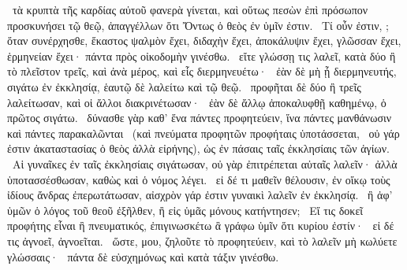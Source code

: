 ~τὰ κρυπτὰ τῆς καρδίας αὐτοῦ φανερὰ γίνεται, καὶ οὕτως πεσὼν ἐπὶ πρόσωπον προσκυνήσει τῷ θεῷ, ἀπαγγέλλων ὅτι Ὄντως ὁ θεὸς ἐν ὑμῖν ἐστιν.
~Τί οὖν ἐστιν, ; ὅταν συνέρχησθε, ἕκαστος ψαλμὸν ἔχει, διδαχὴν ἔχει, ἀποκάλυψιν ἔχει, γλῶσσαν ἔχει, ἑρμηνείαν ἔχει· πάντα πρὸς οἰκοδομὴν γινέσθω.
~εἴτε γλώσσῃ τις λαλεῖ, κατὰ δύο ἢ τὸ πλεῖστον τρεῖς, καὶ ἀνὰ μέρος, καὶ εἷς διερμηνευέτω·
~ἐὰν δὲ μὴ ᾖ διερμηνευτής, σιγάτω ἐν ἐκκλησίᾳ, ἑαυτῷ δὲ λαλείτω καὶ τῷ θεῷ.
~προφῆται δὲ δύο ἢ τρεῖς λαλείτωσαν, καὶ οἱ ἄλλοι διακρινέτωσαν·
~ἐὰν δὲ ἄλλῳ ἀποκαλυφθῇ καθημένῳ, ὁ πρῶτος σιγάτω.
~δύνασθε γὰρ καθ’ ἕνα πάντες προφητεύειν, ἵνα πάντες μανθάνωσιν καὶ πάντες παρακαλῶνται
~(καὶ πνεύματα προφητῶν προφήταις ὑποτάσσεται,
~οὐ γάρ ἐστιν ἀκαταστασίας ὁ θεὸς ἀλλὰ εἰρήνης), ὡς ἐν πάσαις ταῖς ἐκκλησίαις τῶν ἁγίων.
~Αἱ γυναῖκες ἐν ταῖς ἐκκλησίαις σιγάτωσαν, οὐ γὰρ ἐπιτρέπεται αὐταῖς λαλεῖν· ἀλλὰ ὑποτασσέσθωσαν, καθὼς καὶ ὁ νόμος λέγει.
~εἰ δέ τι μαθεῖν θέλουσιν, ἐν οἴκῳ τοὺς ἰδίους ἄνδρας ἐπερωτάτωσαν, αἰσχρὸν γάρ ἐστιν γυναικὶ λαλεῖν ἐν ἐκκλησίᾳ.
~ἢ ἀφ’ ὑμῶν ὁ λόγος τοῦ θεοῦ ἐξῆλθεν, ἢ εἰς ὑμᾶς μόνους κατήντησεν;
~Εἴ τις δοκεῖ προφήτης εἶναι ἢ πνευματικός, ἐπιγινωσκέτω ἃ γράφω ὑμῖν ὅτι κυρίου ἐστίν·
~εἰ δέ τις ἀγνοεῖ, ἀγνοεῖται.
~ὥστε,  μου, ζηλοῦτε τὸ προφητεύειν, καὶ τὸ λαλεῖν μὴ κωλύετε γλώσσαις·
~πάντα δὲ εὐσχημόνως καὶ κατὰ τάξιν γινέσθω.

